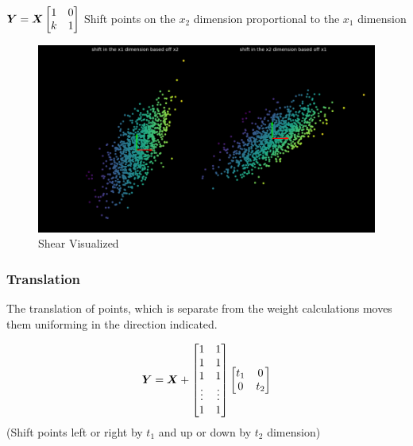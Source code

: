 \(\bm{Y} = \bm{X}  \begin{bmatrix}
    1 & 0\\
    k & 1
\end{bmatrix} \)
Shift points on the \(x_2\) dimension proportional to the \(x_1\) dimension

\begin{figure}[h!]
\begin{center}
\includegraphics{labs/01/images/shear.png}
\end{center} 
\caption{Shear Visualized}
\label{fig:mon}
\end{figure}

\subsubsection{Translation}
The translation of points, which is separate from the weight calculations moves them uniforming in the direction indicated.

\[ \bm{Y} = \bm{X} 
+ \begin{bmatrix}
    1 & 1 \\
    1 & 1 \\
    1 & 1 \\
    \vdots & \vdots  \\
    1 & 1
\end{bmatrix}
\begin{bmatrix}
    t_1 & 0\\
    0 & t_2
\end{bmatrix} \] 
(Shift points left or right by \(t_1\) and up or down by  \(t_2\) dimension)

